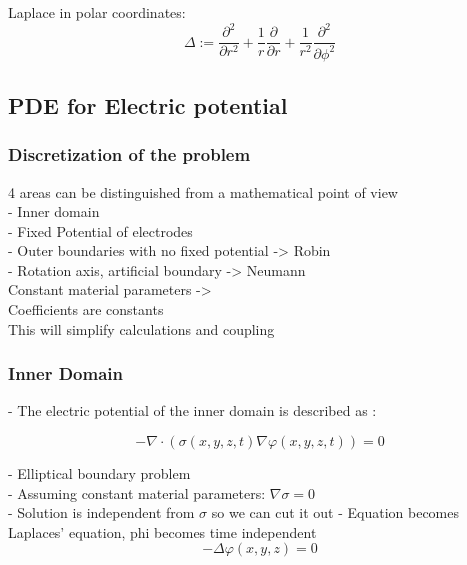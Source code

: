 \documentclass[parskip=half, titlepage=yes, 12pt, BCOR=12mm, DIV=calc]{scrartcl}
\begin{document}
Laplace in polar coordinates:
\begin{equation}
    \Delta := \frac{\partial^2}{\partial r^2} + \frac{1}{r} \frac{\partial}{\partial r} + \frac{1}{r^2} \frac{\partial^2}{\partial \phi^2}
\end{equation}



\subsection{PDE for Electric potential}

\subsubsection{Discretization of the problem}
4 areas can be distinguished from a mathematical point of view \\
- Inner domain \\
- Fixed Potential of electrodes \\
- Outer boundaries with no fixed potential -> Robin \\
- Rotation axis, artificial boundary -> Neumann \\

Constant material parameters -> \\
Coefficients are constants \\
This will simplify calculations and coupling \\

\subsubsection{Inner Domain}

- The electric potential of the inner domain is described as : 

\begin{equation}
    - \nabla \cdot (\sigma(x,y,z,t) \nabla \varphi(x,y,z,t)) = 0
\end{equation}

- Elliptical boundary problem \\
- Assuming constant material parameters: $\nabla \sigma = 0$ \\
- Solution is independent from $\sigma$ so we can cut it out
- Equation becomes Laplaces' equation, phi becomes time independent \\

\begin{equation}
    - \Delta \varphi(x,y,z) = 0
\end{equation}
\end{document}
